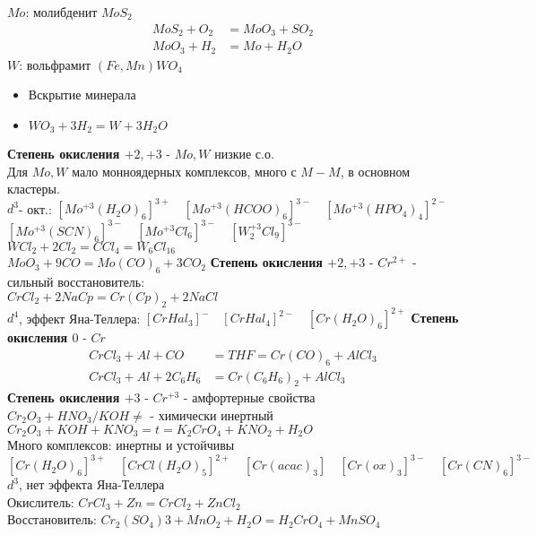 $Mo$: молибденит $MoS_2$
\begin{align*}
MoS_2 + O_2 &= MoO_3 + SO_2 \\
MoO_3 + H_2 &= Mo + H_2O
\end{align*}
$W$: вольфрамит $(Fe, Mn)WO_4$
\begin{itemize}
	\item Вскрытие минерала
	\item $WO_3 + 3 H_2 =W + 3 H_2O$
\end{itemize}
\textbf{Степень окисления $+2, +3$} - $Mo, W$ низкие с.о.\\
Для $Mo, W$ мало монноядерных комплексов, много с $M-M$, в основном кластеры. \\
$d^3$- окт.: $ \left[Mo^{+3}(H_2O)_6 \right]^{3+} \quad \left[Mo^{+3}(HCOO)_6 \right]^{3-} \quad \left[Mo^{+3}(HPO_4)_4 \right]^{2-}$ \\ 
$\left[Mo^{+3}(SCN)_6 \right]^{3-} \quad \left[Mo^{+3}Cl_6 \right]^{3-} \quad \left[W_2^{+3}Cl_9 \right]^{3-} $ \\
$ WCl_2 + 2Cl_2 = CCl_4 = W_6Cl_{16} $ \\
$ MoO_3 + 9CO = Mo(CO)_6 + 3CO_2 $
\textbf{Степень окисления $+2, +3$} - $Cr^{2+}$ - сильный восстановитель: \\
$CrCl_2 + 2 NaCp = Cr(Cp)_2 + 2 NaCl$ \\
$d^4$, эффект Яна-Теллера: $ \left[CrHal_3 \right]^{-} \quad \left[CrHal_4 \right]^{2-} \quad \left[Cr(H_2O)_6 \right]^{2+}  $
\textbf{Степень окисления $0$} - $Cr$ \\
\begin{align*}
CrCl_3 + Al + CO &= THF = Cr(CO)_6 + AlCl_3 \\
CrCl_3 + Al + 2C_6H_6 &= Cr(C_6H_6)_2 + AlCl_3
\end{align*}
\textbf{Степень окисления $+3$} - $Cr^{+3}$ - амфортерные свойства \\
$Cr_2O_3 + HNO_3 / KOH \not = $ - химически инертный \\
$Cr_2O_3 + KOH + KNO_3 = t = K_2CrO_4 + KNO_2 + H_2O$ \\
Много комплексов: инертны и устойчивы \\
\[
\left[Cr(H_2O)_6 \right]^{3+} \quad \left[CrCl(H_2O)_5 \right]^{2+} \quad \left[Cr(acac)_3 \right] \quad \left[Cr(ox)_3 \right]^{3-} \quad \left[Cr(CN)_6 \right]^{3-}	
\]
$d^3$, нет эффекта Яна-Теллера \\
Окислитель: $ CrCl_3 + Zn = CrCl_2 + ZnCl_2 $ \\
Восстановитель: $ Cr_2(SO_4)3 + MnO_2 + H_2O = H_2CrO_4 + MnSO_4 $ \\ 

